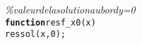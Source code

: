 {\begin{tabbing}
\textit{\%\phantom{x}valeur\phantom{x}de\phantom{x}la\phantom{x}solution\phantom{x}au\phantom{x}bord\phantom{x}y{=}0}\\
\texttt{\textbf{function}}\texttt{\phantom{x}res\phantom{x}{=}\phantom{x}f\_{}x0{(}x{)}}\\
\texttt{res\phantom{x}{=}\phantom{x}sol{(}x{,}0{)}{;}}
\end{tabbing}}
